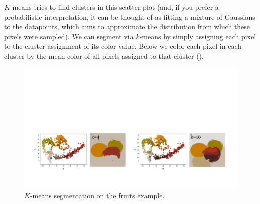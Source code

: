 $K$-means tries to find clusters in this scatter plot (and, if you prefer a probabilistic interpretation, it can be thought of as fitting a mixture of Gaussians to the datapoints, which aims to approximate the distribution from which these pixels were sampled). We can segment via $k$-means by simply assigning each pixel to the cluster assignment of its color value. Below we color each pixel in each cluster by the mean color of all pixels assigned to that cluster (\fig{\ref{fig:perceptual_organization:kmeans_ab_fruits2}}).
\vspace{-0.4cm}
\begin{figure}[h!]
    \centerline{
        \includegraphics[width=1.0\linewidth]{./figures/perceptual_organization/kmeans_ab_fruits2.pdf}
    }
    \caption{$K$-means segmentation on the fruits example.}
    \label{fig:perceptual_organization:kmeans_ab_fruits2}
\end{figure}

